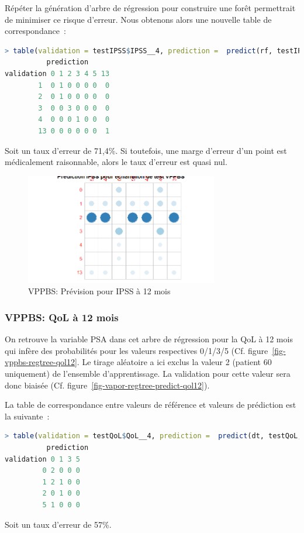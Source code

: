 Répéter la génération d'arbre de régression pour construire une forêt permettrait de
minimiser ce risque d'erreur. Nous obtenons alors une nouvelle table de correspondance~:

\begin{lstlisting}[language=R]
> table(validation = testIPSS$IPSS__4, prediction =  predict(rf, testIPSS))
          prediction
validation 0 1 2 3 4 5 13
        1  0 1 0 0 0 0  0
        2  0 1 0 0 0 0  0
        3  0 0 3 0 0 0  0
        4  0 0 0 1 0 0  0
        13 0 0 0 0 0 0  1
\end{lstlisting}
Soit un taux d'erreur de 71,4\%. Si toutefois, une marge d'erreur d'un point est médicalement raisonnable, alors le taux d'erreur est quasi nul.

\begin{figure}[H]
\centering
\includegraphics[width=0.75\textwidth]{../Fig/VPPBS/vppbs-regtree-predict-ipss12.png}
\caption{VPPBS: Prévision pour IPSS à 12 mois}
\label{fig-vppbs-regtree-predict-ipss12}
\end{figure}

\subsubsection{VPPBS: QoL à 12 mois}

On retrouve la variable PSA dans cet arbre de régression pour la QoL à 12 mois
qui infère des probabilités pour les valeurs respectives 0/1/3/5 (Cf. figure~\ref{fig-vppbs-regtree-qol12}. Le tirage aléatoire a ici exclus la valeur 2
(patient 60 uniquement) de l'ensemble d'apprentissage. La validation pour cette
valeur sera donc biaisée (Cf. figure~\ref{fig-vapor-regtree-predict-qol12}).

La table de correspondance entre valeurs de référence et valeurs de prédiction est la suivante~:
\begin{lstlisting}[language=R]
> table(validation = testQoL$QoL__4, prediction =  predict(dt, testQoL, type="class"))
          prediction
validation 0 1 3 5
         0 2 0 0 0
         1 2 1 0 0
         2 0 1 0 0
         5 1 0 0 0
\end{lstlisting}
Soit un taux d'erreur de 57\%.


